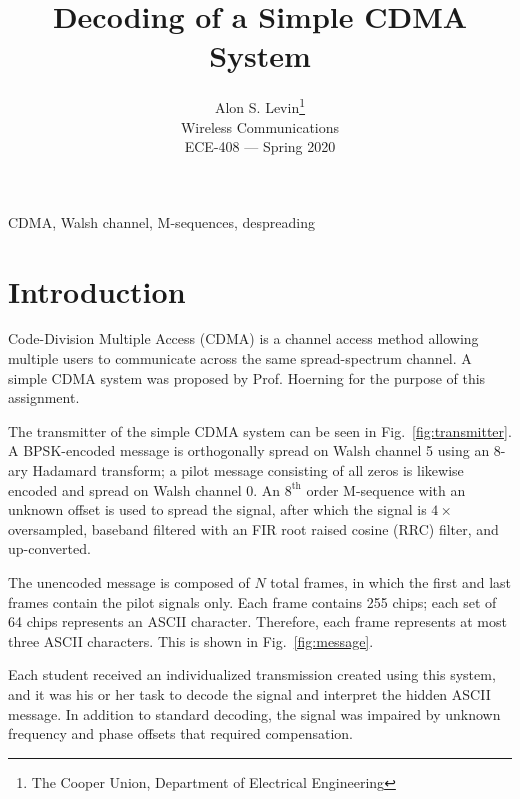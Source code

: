 \documentclass[journal]{IEEEtran}
\begin{document}
\title{Decoding of a Simple CDMA System}
\author{Alon S. Levin\thanks{The Cooper Union, Department of Electrical Engineering}\\Wireless Communications\\ECE-408 --- Spring 2020}
\maketitle

\begin{abstract}

\end{abstract}

\begin{IEEEkeywords}
CDMA, Walsh channel, M-sequences, despreading
\end{IEEEkeywords}

\section{Introduction}\label{sec:intro}
Code-Division Multiple Access (CDMA) is a channel access method allowing multiple users to communicate across the same spread-spectrum channel. A simple CDMA system was proposed by Prof. Hoerning for the purpose of this assignment.

The transmitter of the simple CDMA system can be seen in Fig.~\ref{fig:transmitter}. A BPSK-encoded message is orthogonally spread on Walsh channel 5 using an 8-ary Hadamard transform; a pilot message consisting of all zeros is likewise encoded and spread on Walsh channel 0. An $8^{\text{th}}$ order M-sequence with an unknown offset is used to spread the signal, after which the signal is $4\times$ oversampled, baseband filtered with an FIR root raised cosine (RRC) filter, and up-converted.

The unencoded message is composed of $N$ total frames, in which the first and last frames contain the pilot signals only. Each frame contains 255 chips; each set of 64 chips represents an ASCII character. Therefore, each frame represents at most three ASCII characters. This is shown in Fig.~\ref{fig:message}.

Each student received an individualized transmission created using this system, and it was his or her task to decode the signal and interpret the hidden ASCII message. In addition to standard decoding, the signal was impaired by unknown frequency and phase offsets that required compensation.
\end{document}
